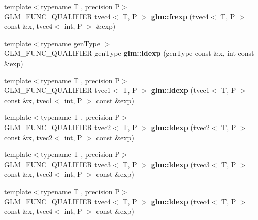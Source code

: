 \begin{DoxyCompactItemize}
\item 
\hypertarget{namespaceglm_a1e479592e7aa1e3e3193de5fdce9a2c1}{{\footnotesize template$<$typename T , precision P$>$ }\\G\-L\-M\-\_\-\-F\-U\-N\-C\-\_\-\-Q\-U\-A\-L\-I\-F\-I\-E\-R tvec4$<$ T, P $>$ {\bfseries glm\-::frexp} (tvec4$<$ T, P $>$ const \&x, tvec4$<$ int, P $>$ \&exp)}\label{namespaceglm_a1e479592e7aa1e3e3193de5fdce9a2c1}

\item 
\hypertarget{namespaceglm_a2632eefd82cbdf3ca860c41579a5ef9e}{{\footnotesize template$<$typename gen\-Type $>$ }\\G\-L\-M\-\_\-\-F\-U\-N\-C\-\_\-\-Q\-U\-A\-L\-I\-F\-I\-E\-R gen\-Type {\bfseries glm\-::ldexp} (gen\-Type const \&x, int const \&exp)}\label{namespaceglm_a2632eefd82cbdf3ca860c41579a5ef9e}

\item 
\hypertarget{namespaceglm_aede23b4113d6d562c9290312af546ffc}{{\footnotesize template$<$typename T , precision P$>$ }\\G\-L\-M\-\_\-\-F\-U\-N\-C\-\_\-\-Q\-U\-A\-L\-I\-F\-I\-E\-R tvec1$<$ T, P $>$ {\bfseries glm\-::ldexp} (tvec1$<$ T, P $>$ const \&x, tvec1$<$ int, P $>$ const \&exp)}\label{namespaceglm_aede23b4113d6d562c9290312af546ffc}

\item 
\hypertarget{namespaceglm_aaa95b8049903d4a4d7af619c0368a624}{{\footnotesize template$<$typename T , precision P$>$ }\\G\-L\-M\-\_\-\-F\-U\-N\-C\-\_\-\-Q\-U\-A\-L\-I\-F\-I\-E\-R tvec2$<$ T, P $>$ {\bfseries glm\-::ldexp} (tvec2$<$ T, P $>$ const \&x, tvec2$<$ int, P $>$ const \&exp)}\label{namespaceglm_aaa95b8049903d4a4d7af619c0368a624}

\item 
\hypertarget{namespaceglm_a991d1c012aefb805ddd6bb97c001553c}{{\footnotesize template$<$typename T , precision P$>$ }\\G\-L\-M\-\_\-\-F\-U\-N\-C\-\_\-\-Q\-U\-A\-L\-I\-F\-I\-E\-R tvec3$<$ T, P $>$ {\bfseries glm\-::ldexp} (tvec3$<$ T, P $>$ const \&x, tvec3$<$ int, P $>$ const \&exp)}\label{namespaceglm_a991d1c012aefb805ddd6bb97c001553c}

\item 
\hypertarget{namespaceglm_a50fbbebff2e110062eafca8839cb5d37}{{\footnotesize template$<$typename T , precision P$>$ }\\G\-L\-M\-\_\-\-F\-U\-N\-C\-\_\-\-Q\-U\-A\-L\-I\-F\-I\-E\-R tvec4$<$ T, P $>$ {\bfseries glm\-::ldexp} (tvec4$<$ T, P $>$ const \&x, tvec4$<$ int, P $>$ const \&exp)}\label{namespaceglm_a50fbbebff2e110062eafca8839cb5d37}

\end{DoxyCompactItemize}


